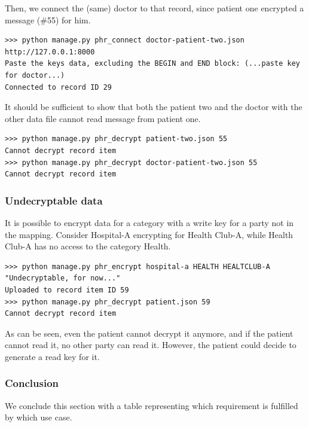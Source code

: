 \documentclass[a4paper]{article}
\begin{document}
			Then, we connect the (same) doctor to that record, since patient one encrypted a message (\#55) for him.
			
			\begin{lstlisting}
>>> python manage.py phr_connect doctor-patient-two.json http://127.0.0.1:8000
Paste the keys data, excluding the BEGIN and END block: (...paste key for doctor...)
Connected to record ID 29
			\end{lstlisting}
			
			It should be sufficient to show that both the patient two and the doctor with the other data file cannot read message from patient one.
			
			\begin{lstlisting}
>>> python manage.py phr_decrypt patient-two.json 55
Cannot decrypt record item
>>> python manage.py phr_decrypt doctor-patient-two.json 55
Cannot decrypt record item
			\end{lstlisting}
			
		\subsubsection{Undecryptable data}\label{sec:usecase_9}
			It is possible to encrypt data for a category with a write key for a party not in the mapping. Consider Hospital-A encrypting for Health Club-A, while Health Club-A has no access to the category Health.
			
			\begin{lstlisting}
>>> python manage.py phr_encrypt hospital-a HEALTH HEALTCLUB-A "Undecryptable, for now..."
Uploaded to record item ID 59
>>> python manage.py phr_decrypt patient.json 59
Cannot decrypt record item
			\end{lstlisting}
			
			As can be seen, even the patient cannot decrypt it anymore, and if the patient cannot read it, no other party can read it. However, the patient could decide to generate a read key for it.
		
		\subsubsection{Conclusion}
			We conclude this section with a table representing which requirement is fulfilled by which use case.
\end{document}
